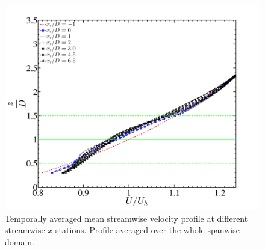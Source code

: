 \begin{figure}
\centering
\includegraphics[width = 0.8\linewidth]{stats/velprof_Npoints_avg.pdf}
\caption[Mean streamwise velocity at $x$ stations 3]{Temporally averaged mean streamwise velocity profile at different streamwise $x$ stations. Profile averaged over the whole spanwise domain. }\label{meanstat3}
\end{figure}


